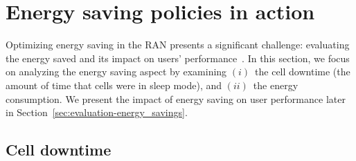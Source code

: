\vspace{-2pt}
\section{Energy saving policies in action}
\label{sec:energy_savings}
\vspace{-4pt}

Optimizing energy saving in the RAN presents a significant challenge: evaluating the energy saved and its impact on users’ performance~\cite{Tan2022}. 
In this section, we focus on analyzing the energy saving aspect by examining $(i)$~the cell downtime (\ie the amount of time that cells were in sleep mode), and $(ii)$~the energy consumption. We present the impact of energy saving on user performance later in Section~\ref{sec:evaluation-energy_savings}.

\vspace{-2pt}
\subsection{Cell downtime}
\vspace{-2pt}




